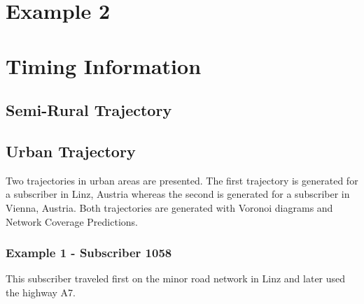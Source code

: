 \section{Example 2}

\section{Timing Information}
\subsection{Semi-Rural Trajectory}


\subsection{Urban Trajectory} 
Two trajectories in urban areas are presented. The first trajectory is generated for a subscriber in Linz, Austria whereas the second is generated for a subscriber in Vienna, Austria. Both trajectories are generated with Voronoi diagrams and Network Coverage Predictions.
\subsubsection{Example 1 - Subscriber 1058}
This subscriber traveled first on the minor road network in Linz and later used the highway A7.

